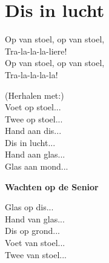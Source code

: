 \section{Dis in lucht}
Op van stoel, op van stoel,\\
Tra-la-la-la-liere!\\
Op van stoel, op van stoel,\\
Tra-la-la-la-la!

(Herhalen met:)\\
Voet op stoel...\\
Twee op stoel...\\
Hand aan dis...\\
Dis in lucht...\\
Hand aan glas...\\
Glas aan mond...

\textbf{Wachten op de Senior}

Glas op dis...\\
Hand van glas...\\
Dis op grond...\\
Voet van stoel...\\
Twee van stoel...
